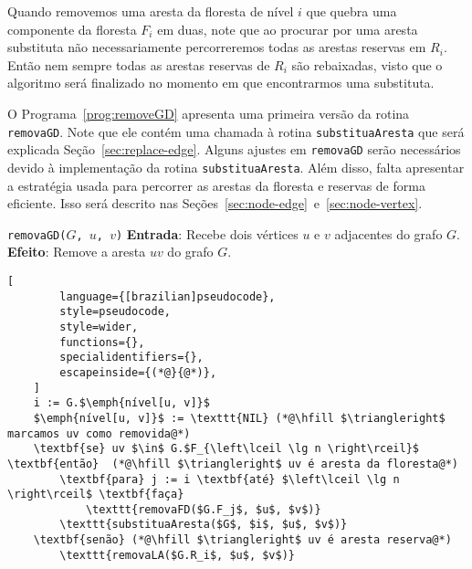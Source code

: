 Quando removemos uma aresta da floresta de nível $i$ que quebra uma componente da floresta $F_i$ em duas, note que ao procurar por uma aresta substituta não necessariamente percorreremos todas as arestas reservas em $R_i$. Então nem sempre todas as arestas reservas de $R_i$ são rebaixadas, visto que o algoritmo será finalizado no momento em que encontrarmos uma substituta.

O Programa~\ref{prog:removeGD} apresenta uma primeira versão da rotina \texttt{removaGD}. Note que ele contém uma chamada à rotina \texttt{substituaAresta} que será explicada Seção~\ref{sec:replace-edge}. Alguns ajustes em \texttt{removaGD} serão necessários devido à implementação da rotina \texttt{substituaAresta}. 
Além disso, falta apresentar a estratégia usada para percorrer as arestas da floresta e reservas de forma eficiente. Isso será descrito nas Seções~\ref{sec:node-edge}~e~\ref{sec:node-vertex}.

\begin{programruledcaption}{\texttt{removaGD($G$, $u$, $v$)} \label{prog:removeGD}}
    \noindent\textbf{Entrada}: Recebe dois vértices $u$ e $v$ adjacentes do grafo $G$. \\
    \noindent\textbf{Efeito}: Remove a aresta $uv$ do grafo $G$. 
    \vspace{-0.5\baselineskip}
    \begin{lstlisting}[
        language={[brazilian]pseudocode},
        style=pseudocode,
        style=wider,
        functions={},
        specialidentifiers={},
        escapeinside={(*@}{@*)},
    ]
    i := G.$\emph{nível[u, v]}$
    $\emph{nível[u, v]}$ := \texttt{NIL} (*@\hfill $\triangleright$ marcamos uv como removida@*)
    \textbf{se} uv $\in$ G.$F_{\left\lceil \lg n \right\rceil}$ \textbf{então}  (*@\hfill $\triangleright$ uv é aresta da floresta@*)
        \textbf{para} j := i \textbf{até} $\left\lceil \lg n \right\rceil$ \textbf{faça}
            \texttt{removaFD($G.F_j$, $u$, $v$)}
        \texttt{substituaAresta($G$, $i$, $u$, $v$)}
    \textbf{senão} (*@\hfill $\triangleright$ uv é aresta reserva@*)
        \texttt{removaLA($G.R_i$, $u$, $v$)}
    \end{lstlisting}
    \vspace{-0.5\baselineskip}
\end{programruledcaption}










































